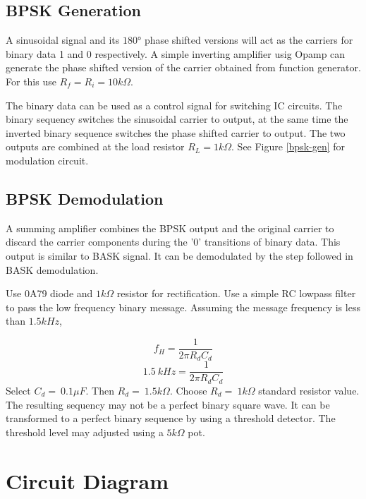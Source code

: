 \subsection*{BPSK Generation}

A sinusoidal signal and its $180°$ phase shifted versions will act as the carriers for binary data 1 and 0 respectively. A simple inverting amplifier usig Opamp can generate the phase shifted version of the carrier obtained from function generator. For this use $R_f =R_i = 10 k \Omega$.

The binary data can be used as a control signal for switching IC circuits. The binary sequency switches the sinusoidal carrier to output, at the same time the inverted binary sequence switches the phase shifted carrier to output. The two outputs are combined at the load resistor $R_L =1 k\Omega$. See Figure \ref{bpsk-gen} for modulation circuit.


\subsection*{BPSK Demodulation}

A summing amplifier combines the BPSK output and the original carrier to discard the carrier components during the '0' transitions of binary data. This output is similar to BASK signal. It can be demodulated by the step followed in BASK demodulation.

\noindent Use 0A79 diode and $1 k\Omega $ resistor for rectification.
\noindent Use a simple RC lowpass filter to pass the low frequency binary message. Assuming the message frequency is less than $1.5 kHz$,
 
\begin{equation}
f_H=\frac{1}{2\pi R_dC_d}
\end{equation}
\begin{equation}
1.5\ kHz=\frac{1}{2\pi R_dC_d}
\end{equation}
\noindent Select $C_d=\ 0.1 \mu F$. Then $R_d=\ 1.5k\Omega$.
Choose $R_d=\ 1k\Omega$ standard resistor value.\\

The resulting sequency may not be a perfect binary square wave. It can be transformed to a perfect binary sequence by using a threshold detector. The threshold level may adjusted using a $5 k\Omega$ pot.

\section*{Circuit Diagram}

